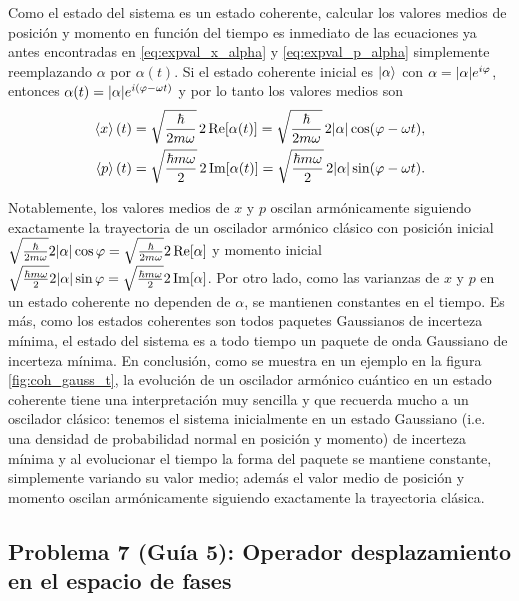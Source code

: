 \documentclass[10pt, a4paper]{article}
\newcommand{\wt}{\omega t}
\newcommand{\xprefactsq}{\frac{\hbar}{2m\omega}}
\newcommand{\xprefact}{\sqrt{\xprefactsq}}
\newcommand{\pprefactsq}{\frac{\hbar m \omega}{2}}
\newcommand{\pprefact}{\sqrt{\pprefactsq}}
\numberwithin{equation}{subsection}
\begin{document}
\bigbreak

Como el estado del sistema es un estado coherente, calcular los valores medios
de posición y momento en función del tiempo es inmediato de las ecuaciones ya
antes encontradas en \eqref{eq:expval_x_alpha} y \eqref{eq:expval_p_alpha}
simplemente reemplazando $\alpha$ por $\alpha(t)$. Si el estado coherente
inicial es $\ket{\alpha}$ con $\alpha = \abs{\alpha}e^{i\varphi}$, entonces
$\alpha(t) = \abs{\alpha}e^{i(\varphi-\wt)}$ y por lo tanto los valores medios
son
\begin{align}
  \expval{x}(t) &= \xprefact\,2\Re[\alpha(t)] =
    \xprefact\,2\abs{\alpha}\cos(\varphi-\wt),
    \label{eq:expval_x_alpha_tevol} \\
  \expval{p}(t) &= \pprefact\,2\Im[\alpha(t)] =
    \pprefact\,2\abs{\alpha}\sin(\varphi-\wt).
    \label{eq:expval_p_alpha_tevol}
\end{align}

Notablemente, los valores medios de $x$ y $p$ oscilan armónicamente siguiendo
exactamente la trayectoria de un oscilador armónico clásico con posición
inicial $\xprefact 2\abs{\alpha}\cos\varphi = \xprefact 2\Re[\alpha]$ y momento
inicial $\pprefact 2\abs{\alpha}\sin\varphi = \pprefact 2\Im[\alpha]$.
Por otro lado, como las varianzas de $x$ y $p$ en un estado coherente no
dependen de $\alpha$, se mantienen constantes en el tiempo. Es más, como los
estados coherentes son todos paquetes Gaussianos de incerteza mínima, el estado
del sistema es a todo tiempo un paquete de onda Gaussiano de incerteza mínima.
En conclusión, como se muestra en un ejemplo en la figura
\ref{fig:coh_gauss_t}, la evolución de un oscilador armónico cuántico en un
estado coherente tiene una interpretación muy sencilla y que recuerda mucho a
un oscilador clásico: tenemos el sistema inicialmente en un estado Gaussiano
(i.e. una densidad de probabilidad normal en posición y momento) de incerteza
mínima y al evolucionar el tiempo la forma del paquete se mantiene constante,
simplemente variando su valor medio; además el valor medio de posición y
momento oscilan armónicamente siguiendo exactamente la trayectoria clásica.

\bigbreak


\subsection{Problema 7 (Guía 5):
  Operador desplazamiento en el espacio de fases}
\label{exc:phase_despl_op}
\end{document}

